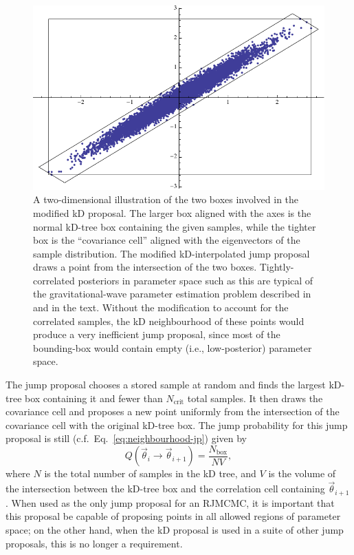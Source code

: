\documentclass{rsos}
\newcommand{\vtheta}{\vec{\theta}}
\newcommand{\Nbox}{N_\mathrm{box}}
\newcommand{\Ncrit}{N_\mathrm{crit}}
\newcommand{\ee}{\end{equation}}
\newcommand{\bel}[1]{\begin{equation}\label{#1}}
\begin{document}
\begin{figure}
  \includegraphics[width=0.8\columnwidth]{PCC}
  \caption{\label{fig:PCC} A two-dimensional illustration of the two
    boxes involved in the modified kD proposal.  The larger box
    aligned with the axes is the normal kD-tree box containing the
    given samples, while the tighter box is the ``covariance cell''
    aligned with the eigenvectors of the sample distribution.  The
    modified kD-interpolated jump proposal draws a point from the
    intersection of the two boxes. Tightly-correlated posteriors in
    parameter space such as this are typical of the gravitational-wave
    parameter estimation problem described in \protect\cite{Veitch:2014} and
    in the text.  Without the modification to account for the
    correlated samples, the kD neighbourhood of these points would
    produce a very inefficient jump proposal, since most of the
    bounding-box would contain empty (i.e., low-posterior) parameter
    space.}
\end{figure}

The jump proposal chooses a stored sample at random and finds the largest kD-tree box containing it and fewer than $\Ncrit$ total samples. It then draws the covariance cell and proposes a new point uniformly from the intersection of the covariance cell with the original kD-tree box.
The jump probability for this jump proposal is still (c.f.\ Eq.\
\eqref{eq:neighbourhood-jp}) given by
%
\bel{modforward} Q(\vtheta_i \rightarrow \vtheta_{i+1}) =
\frac{\Nbox}{N V} , \ee
%
where $N$ is the total number of samples in the kD tree, and $V$ is the
volume of the intersection between the kD-tree box and the correlation cell containing $\vtheta_{i+1}$. When used as the only jump proposal for an
RJMCMC, it is important that this proposal be capable of
proposing points in all allowed regions of parameter space; on the
other hand, when the kD proposal is used in a suite of other jump proposals, this is no longer a requirement.
\end{document}
